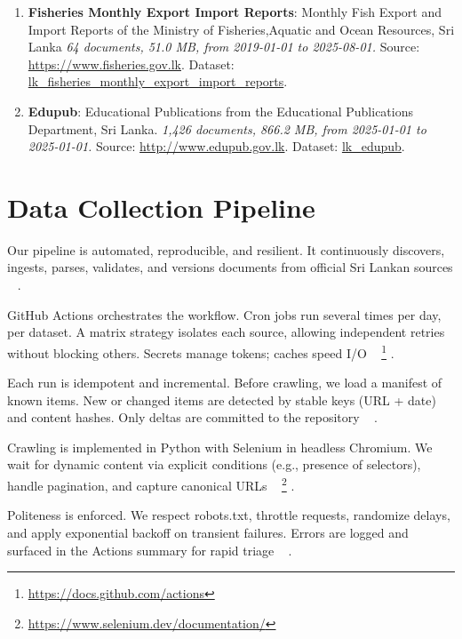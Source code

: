 \documentclass[10pt,a4paper]{article}%
\begin{document}
\begin{enumerate}
\item%
\textbf{Fisheries Monthly Export Import Reports}: Monthly Fish Export and Import Reports of the Ministry of Fisheries,Aquatic and Ocean Resources, Sri Lanka\textit{ 64 documents, 51.0 MB, from 2019{-}01{-}01 to 2025{-}08{-}01.} Source: \href{https://www.fisheries.gov.lk}{https://www.fisheries.gov.lk}. Dataset: \href{https://github.com/nuuuwan/lk\_fisheries/tree/data\_lk\_fisheries\_monthly\_export\_import\_reports/data/lk\_fisheries\_monthly\_export\_import\_reports}{lk\_fisheries\_monthly\_export\_import\_reports}.%
\item%
\textbf{Edupub}: Educational Publications from the Educational Publications Department, Sri Lanka.\textit{ 1,426 documents, 866.2 MB, from 2025{-}01{-}01 to 2025{-}01{-}01.} Source: \href{http://www.edupub.gov.lk}{http://www.edupub.gov.lk}. Dataset: \href{https://github.com/nuuuwan/lk\_edupub/tree/data/data/lk\_edupub}{lk\_edupub}.%
\end{enumerate}

%
\section{Data Collection Pipeline}%
\label{sec:DataCollectionPipeline}%
Our pipeline is automated, reproducible, and
 resilient. It continuously discovers, ingests,
 parses, validates, and versions documents from
 official Sri Lankan sources%
~%
\citep{MLOpsSurvey2022}%
.%

%
GitHub Actions orchestrates the workflow.
 Cron jobs run several times per day, per
 dataset. A matrix strategy isolates each source,
 allowing independent retries without blocking
 others. Secrets manage tokens; caches speed I/O%
~%
\footnote{\href{https://docs.github.com/actions}{https://docs.github.com/actions}}%
.%

%
Each run is idempotent and incremental.
 Before crawling, we load a manifest of known
 items. New or changed items are detected by
 stable keys (URL + date) and content hashes.
 Only deltas are committed to the repository%
~%
\citep{ReproducibleResearch2017}%
.%

%
Crawling is implemented in Python with
 Selenium in headless Chromium.
 We wait for dynamic content via explicit
 conditions (e.g., presence of selectors),
 handle pagination, and capture canonical URLs%
~%
\footnote{\href{https://www.selenium.dev/documentation/}{https://www.selenium.dev/documentation/}}%
.%

%
Politeness is enforced. We respect robots.txt,
 throttle requests, randomize delays, and apply
 exponential backoff on transient failures.
 Errors are logged and surfaced in the Actions
 summary for rapid triage%
~%
\citep{WebCrawlingBestPractices2021}%
.%
\end{document}
